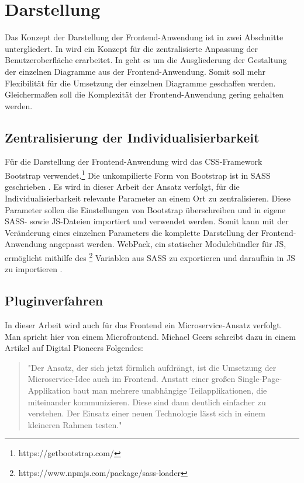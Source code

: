 \section{Darstellung}
\label{sec:darstellung}
Das Konzept der Darstellung der Frontend-Anwendung ist in zwei Abschnitte untergliedert.
In  wird ein Konzept für die
zentralisierte Anpassung der Benutzeroberfläche erarbeitet. In 
geht es um die Ausgliederung der Gestaltung der einzelnen Diagramme aus der Frontend-Anwendung.
Somit soll mehr Flexibilität für die Umsetzung der einzelnen Diagramme geschaffen werden.
Gleichermaßen soll die Komplexität der Frontend-Anwendung gering gehalten werden.

\subsection{Zentralisierung der Individualisierbarkeit}
\label{subsec:zentralisierungderindividualisierbarkeit}
Für die Darstellung der Frontend-Anwendung wird das CSS-Framework Bootstrap verwendet.\footnote{https://getbootstrap.com/}
Die unkompilierte Form von Bootstrap ist in SASS geschrieben \cite[2. Abschnitt]{Bootstrap4punkt4}.
Es wird in dieser Arbeit der Ansatz verfolgt, für die Individualisierbarkeit relevante Parameter an einem Ort
zu zentralisieren. Diese Parameter sollen die Einstellungen von Bootstrap überschreiben und
in eigene SASS- sowie JS-Dateien importiert und verwendet werden. Somit kann mit der Veränderung
eines einzelnen Parameters die komplette Darstellung der Frontend-Anwendung angepasst werden.
WebPack, ein statischer Modulebündler für JS, ermöglicht mithilfe des \footnote{https://www.npmjs.com/package/sass-loader} Variablen
aus SASS zu exportieren und daraufhin in JS zu importieren \cite{ShareSCSSwithJS}.

\subsection{Pluginverfahren}
\label{subsec:pluginverfahren}

In dieser Arbeit wird auch für das Frontend ein Microservice-Ansatz verfolgt. Man spricht hier von einem
Microfrontend. Michael Geers schreibt dazu in einem Artikel auf Digital Pioneers Folgendes:

\begin{quote}
"Der Ansatz, der sich jetzt förmlich aufdrängt, ist die Umsetzung der Microservice-Idee
auch im Frontend. Anstatt einer ­großen Single-Page-Applikation baut man mehrere unabhängige
Teilapplikationen, die miteinander kommunizieren. Diese sind dann deutlich einfacher zu verstehen.
Der Einsatz einer neuen Technologie lässt sich in einem kleineren Rahmen testen."\cite{MicrofrontendT3N}
\end{quote}

